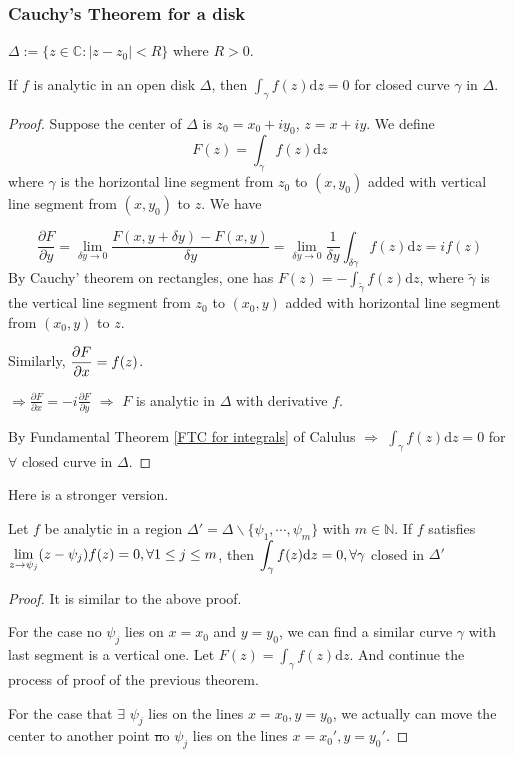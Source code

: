  \subsubsection{Cauchy's Theorem for a disk}
  $ \Delta:=\{z\in \mathbb{C}:|z-z_0|<R\} $ where  $ R>0 $.
  \begin{theorem}\label{Cauchy's theorem for a disk}
    If  $ f $ is analytic in an open disk  $ \Delta $, then  $ \int_\gamma f(z)\mathrm{d}z=0 $  for closed curve  $ \gamma $ in  $ \Delta $.  
  \end{theorem}  
  \begin{proof}
    Suppose the center of  $ \Delta $ is  $ z_0=x_0+iy_0 $,  $ z=x+iy $. We define 
    \[F(z)=\int_\gamma f(z)\mathrm{d}z\]
    where  $ \gamma $ is the horizontal line segment from  $ z_0 $ to  $ (x,y_0) $ added with vertical line segment from  $ (x,y_0) $ to  $ z $. We have
    
    \begin{equation}
        \frac{\partial F}{\partial y}=\lim_{\delta y\to 0}\frac{F(x,y+\delta y)-F(x,y)}{\delta y}=\lim_{\delta y\to 0}\frac{1}{\delta y}\int_{\delta\gamma}f(z)\mathrm{d}z=if(z)
    \end{equation}
    By Cauchy' theorem on rectangles, one has  $ F(z)=-\int_{\tilde{\gamma}}f(z)\mathrm{d}z $, where  $ \tilde{\gamma} $ is the vertical line segment from  $ z_0 $ to  $ (x_0,y) $ added with horizontal line segment from  $ (x_0,y) $ to  $ z $.
    
    Similarly,  $ \displaystyle\frac{\partial F}{\partial x}=f(z) $.
    
     $ \Rightarrow \frac{\partial F}{\partial x}=-i\frac{\partial F}{\partial y} $ $ \Rightarrow  $ $ F  $   is analytic in  $ \Delta $  with derivative  $ f $.
     
     By Fundamental Theorem \ref{FTC for integrals} of Calulus $ \Rightarrow  $  $ \int_\gamma f(z)\mathrm{d}z=0 $ for  $ \forall  $ closed curve in  $ \Delta $.    
  \end{proof}
  Here is a stronger version.
  \begin{theorem}\label{stronger version of Cauchy's theorem for a disk}
    Let  $ f $ be analytic in a region  $ \Delta'=\Delta\backslash\{\psi_1,\cdots,\psi_m\} $ with  $ m\in \mathbb{N} $. If  $ f $ satisfies  $ \displaystyle\lim\limits_{z\to \psi_j}(z-\psi_j)f(z)=0,\forall 1\leq j\leq m $, then  $ \displaystyle\int_\gamma f(z)\mathrm{d}z=0,\forall \gamma $ closed in  $ \Delta'  $     
  \end{theorem}
  \begin{proof}
    It is similar to the above proof.
    
    For the case no  $ \psi_j $ lies on  $ x=x_0 $ and  $ y=y_0 $, we can find a similar curve $ \gamma $ with last segment is a vertical one. Let  $ F(z)=\int_\gamma f(z)\mathrm{d}z $. And continue the process of proof of the previous theorem.  
    
    For the case that  $ \exists $  $ \psi_j $ lies on the lines  $ x=x_0,y=y_0 $, we actually can move the center to another point \st no  $ \psi_j $ lies on the lines  $ x=x_0',y=y_0'$.   
  \end{proof}
